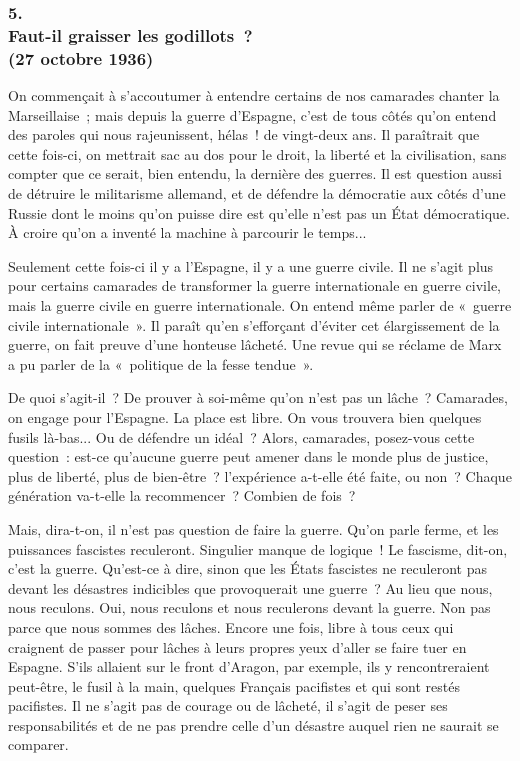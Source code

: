 \documentclass[french,twoside]{book} %
\begin{document}
\subsubsection[{5. Faut-il graisser les godillots ? (27 octobre 1936)}]{5. \\
Faut-il graisser les godillots ? \\
(27 octobre 1936)}
\noindent \par
On commençait à s'accoutumer à entendre certains de nos camarades chanter la Marseillaise ; mais depuis la guerre d'Espagne, c'est de tous côtés qu'on entend des paroles qui nous rajeunissent, hélas ! de vingt-deux ans. Il paraîtrait que cette fois-ci, on mettrait sac au dos pour le droit, la liberté et la civilisation, sans compter que ce serait, bien entendu, la dernière des guerres. Il est question aussi de détruire le militarisme allemand, et de défendre la démocratie aux côtés d'une Russie dont le moins qu'on puisse dire est qu'elle n'est pas un État démocratique. À croire qu'on a inventé la machine à parcou­rir le temps...\par
Seulement cette fois-ci il y a l'Espagne, il y a une guerre civile. Il ne s'agit plus pour certains camarades de transformer la guerre internationale en guerre civile, mais la guerre civile en guerre internationale. On entend même parler de « guerre civile internationale ». Il paraît qu'en s'efforçant d'éviter cet élar­gissement de la guerre, on fait preuve d'une honteuse lâcheté. Une revue qui se réclame de Marx a pu parler de la « politique de la fesse tendue ».\par
De quoi s'agit-il ? De prouver à soi-même qu'on n'est pas un lâche ? Camarades, on engage pour l'Espagne. La place est libre. On vous trouvera bien quelques fusils là-bas... Ou de défendre un idéal ? Alors, camarades, posez-vous cette question : est-ce qu'aucune guerre peut amener dans le monde plus de justice, plus de liberté, plus de bien-être ? l'expérience a-t-elle été faite, ou non ? Chaque génération va-t-elle la recommencer ? Combien de fois ?\par
Mais, dira-t-on, il n'est pas question de faire la guerre. Qu'on parle ferme, et les puissances fascistes reculeront. Singulier manque de logique ! Le fascisme, dit-on, c'est la guerre. Qu'est-ce à dire, sinon que les États fascistes ne reculeront pas devant les désastres indicibles que provoquerait une guerre ? Au lieu que nous, nous reculons. Oui, nous reculons et nous reculerons devant la guerre. Non pas parce que nous sommes des lâches. Encore une fois, libre à tous ceux qui craignent de passer pour lâches à leurs propres yeux d'aller se faire tuer en Espagne. S'ils allaient sur le front d'Aragon, par exemple, ils y rencontreraient peut-être, le fusil à la main, quelques Français pacifistes et qui sont restés pacifistes. Il ne s'agit pas de courage ou de lâcheté, il s'agit de peser ses responsabilités et de ne pas prendre celle d'un désastre auquel rien ne saurait se comparer.\par
\end{document}
